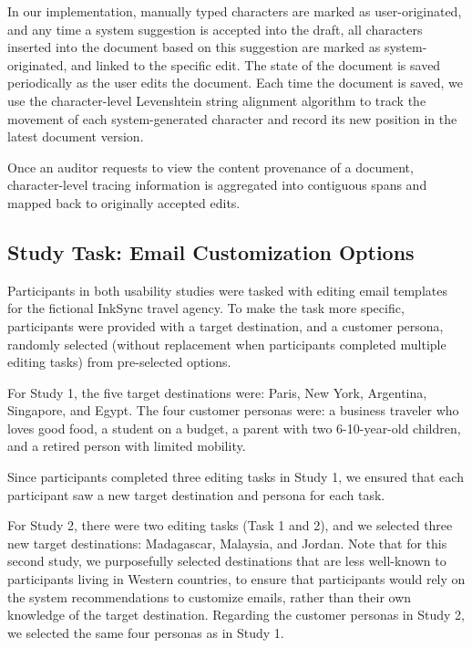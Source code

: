 \documentclass[manuscript]{acmart}
\begin{document}
In our implementation, manually typed characters are marked as user-originated, and any time a system suggestion is accepted into the draft, all characters inserted into the document based on this suggestion are marked as system-originated, and linked to the specific edit. The state of the document is saved periodically as the user edits the document. Each time the document is saved, we use the character-level Levenshtein string alignment algorithm \cite{Levenshtein1966BinaryCC} to track the movement of each system-generated character and record its new position in the latest document version.

Once an auditor requests to view the content provenance of a document, character-level tracing information is aggregated into contiguous spans and mapped back to originally accepted edits.

\subsection{Study Task: Email Customization Options} \label{app:study_customization_options}

Participants in both usability studies were tasked with editing email templates for the fictional InkSync travel agency. To make the task more specific, participants were provided with a target destination, and a customer persona, randomly selected (without replacement when participants completed multiple editing tasks) from pre-selected options.

For Study 1, the five target destinations were: Paris, New York, Argentina, Singapore, and Egypt. The four customer personas were: a business traveler who loves good food, a student on a budget, a parent with two 6-10-year-old children, and a retired person with limited mobility.

Since participants completed three editing tasks in Study 1, we ensured that each participant saw a new target destination and persona for each task.

For Study 2, there were two editing tasks (Task 1 and 2), and we selected three new target destinations: Madagascar, Malaysia, and Jordan. Note that for this second study, we purposefully selected destinations that are less well-known to participants living in Western countries, to ensure that participants would rely on the system recommendations to customize emails, rather than their own knowledge of the target destination. Regarding the customer personas in Study 2, we selected the same four personas as in Study 1.
\end{document}
